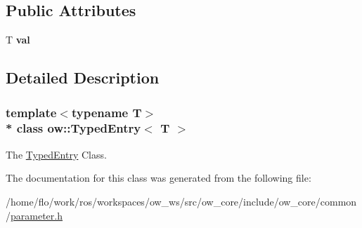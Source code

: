 \subsection*{Public Attributes}
\begin{DoxyCompactItemize}
\item 
T {\bfseries val}\hypertarget{classow_1_1TypedEntry_af1e4ed28024891bac5d31f5b9ae45b90}{}\label{classow_1_1TypedEntry_af1e4ed28024891bac5d31f5b9ae45b90}

\end{DoxyCompactItemize}


\subsection{Detailed Description}
\subsubsection*{template$<$typename T$>$\\*
class ow\+::\+Typed\+Entry$<$ T $>$}

The \hyperlink{classow_1_1TypedEntry}{Typed\+Entry} Class. 

The documentation for this class was generated from the following file\+:\begin{DoxyCompactItemize}
\item 
/home/flo/work/ros/workspaces/ow\+\_\+ws/src/ow\+\_\+core/include/ow\+\_\+core/common/\hyperlink{parameter_8h}{parameter.\+h}\end{DoxyCompactItemize}
